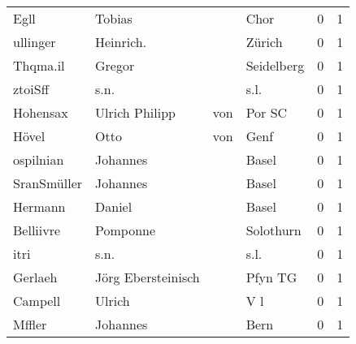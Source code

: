 \begin{center}
\begin{tiny}
\begin{longtabu}{llllrr}
                     Egll &                             Tobias &             &                                        Chor &          0 &         1 \\
                 ullinger &                          Heinrich. &             &                                      Zürich &          0 &         1 \\
                 Thqma.il &                             Gregor &             &                                  Seidelberg &          0 &         1 \\
                  ztoiSff &                               s.n. &             &                                        s.l. &          0 &         1 \\
                 Hohensax &                     Ulrich Philipp &         von &                                      Por SC &          0 &         1 \\
                    Hövel &                               Otto &         von &                                        Genf &          0 &         1 \\
                ospilnian &                           Johannes &             &                                       Basel &          0 &         1 \\
              SranSmüller &                           Johannes &             &                                       Basel &          0 &         1 \\
                  Hermann &                             Daniel &             &                                       Basel &          0 &         1 \\
                Belliivre &                           Pomponne &             &                                   Solothurn &          0 &         1 \\
                     itri &                               s.n. &             &                                        s.l. &          0 &         1 \\
                  Gerlaeh &                 Jörg Ebersteinisch &             &                                     Pfyn TG &          0 &         1 \\
                  Campell &                             Ulrich &             &                                         V l &          0 &         1 \\
                   Mffler &                           Johannes &             &                                        Bern &          0 &         1 \\

\end{longtabu}
\end{tiny}
\end{center}
